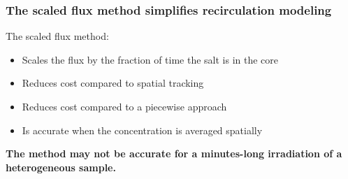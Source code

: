 \begin{frame}
  \frametitle{The scaled flux method simplifies recirculation modeling}

\begin{block}{The scaled flux method:}
    \begin{itemize}
        \item Scales the flux by the fraction of time the salt is in the core
        \item Reduces cost compared to spatial tracking
        \item Reduces cost compared to a piecewise approach
        \item Is accurate when the concentration is averaged spatially \cite{seifert_luke_computationally_2025}
    \end{itemize}
\end{block}

\textbf{The method may not be accurate for a minutes-long irradiation of a heterogeneous sample.}
\end{frame}